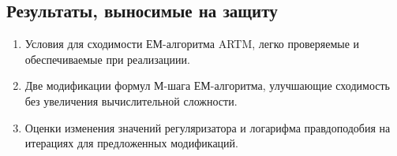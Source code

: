 \documentclass[12pt]{article}
\begin{document}
\subsection{Результаты, выносимые на защиту}
\begin{enumerate}
\item Условия для сходимости ЕМ-алгоритма ARTM, легко проверяемые и обеспечиваемые при реализациии.
\item Две модификации формул М-шага ЕМ-алгоритма, улучшающие сходимость без увеличения вычислительной сложности.
\item Оценки изменения значений регуляризатора и логарифма правдоподобия на итерациях для предложенных модификаций.
\end{enumerate}
\newpage



\end{document}
